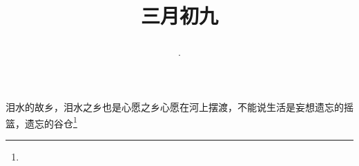 \title{\date[d=17,m=4,y=2024][year:cn-y,年,month:cn,day:cn,日,·,weekday]·三月初九 }
泪水的故乡，泪水之乡也是心愿之乡心愿在河上摆渡，不能说生活是妄想遗忘的摇篮，遗忘的谷仓\footnote{ }

